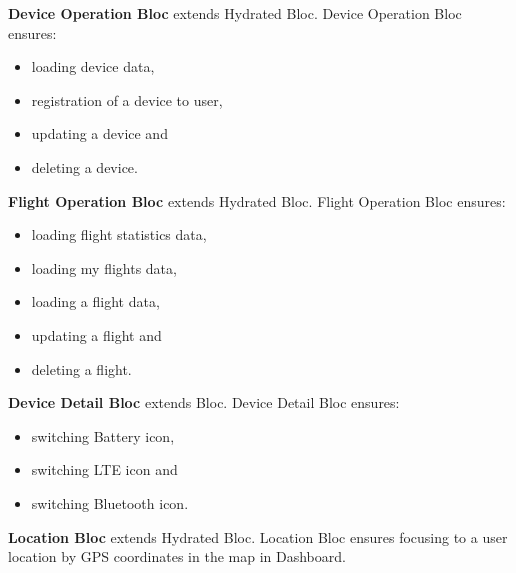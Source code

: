 \textbf{Device Operation Bloc} extends Hydrated Bloc.
Device Operation Bloc ensures:
\begin{itemize}
    \item loading device data,
    \item registration of a device to user,
    \item updating a device and
    \item deleting a device.
\end{itemize}

\textbf{Flight Operation Bloc} extends Hydrated Bloc.
Flight Operation Bloc ensures:
\begin{itemize}
    \item loading flight statistics data,
    \item loading my flights data,
    \item loading a flight data,
    \item updating a flight and
    \item deleting a flight.
\end{itemize}

\textbf{Device Detail Bloc} extends Bloc.
Device Detail Bloc ensures:
\begin{itemize}
    \item switching Battery icon,
    \item switching LTE icon and
    \item switching Bluetooth icon.
\end{itemize}

\textbf{Location Bloc} extends Hydrated Bloc.
Location Bloc ensures focusing to a user location by GPS coordinates in the map in Dashboard.

